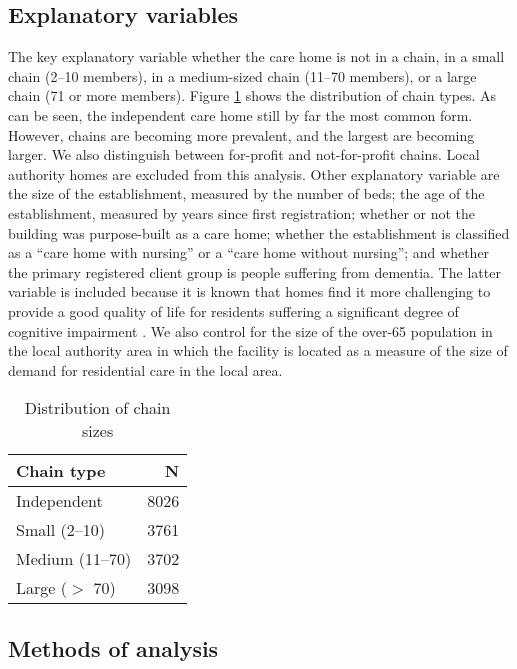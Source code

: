 \documentclass[a4paper,11pt,titlepage,british]{article}
\begin{document}
\subsection{Explanatory variables}

The key explanatory variable whether the care home is not in a chain, in a small chain (2--10 members), in a medium-sized chain (11--70 members), or a large chain (71 or more members).  Figure \ref{tab:chains} shows the distribution of chain types.  As can be seen, the independent care home still by far the most common form.  However, chains are becoming more prevalent, and the largest are becoming larger.
We also distinguish between for-profit and not-for-profit chains.  Local authority homes are excluded from this analysis. Other explanatory variable are the size of the establishment, measured by the number of beds; the age of the establishment, measured by years since first registration; whether or not the building was purpose-built as a care home; whether the establishment is classified as a ``care home with nursing'' or a ``care home without nursing''; and whether the primary registered client group is people suffering from dementia.  The latter variable is included because it is known that homes find it more challenging to provide a good quality of life for residents suffering a significant degree of cognitive impairment \parencite{West2016}. We also control for the size of the over-65 population in the local authority area in which the facility is located as a measure of the size of demand for residential care in the local area.

\begin{table}[ht]
\begin{center}
\begin{tabular}{lr}
\toprule
Chain type & N \\
\midrule
Independent & 8026 \\
Small (2--10) & 3761 \\
Medium (11--70) & 3702 \\
Large ($>$ 70) & 3098 \\
\bottomrule
\end{tabular}
\end{center}
\caption{Distribution of chain sizes \label{tab:chains}}
\end{table}

\subsection{Methods of analysis}
\end{document}
